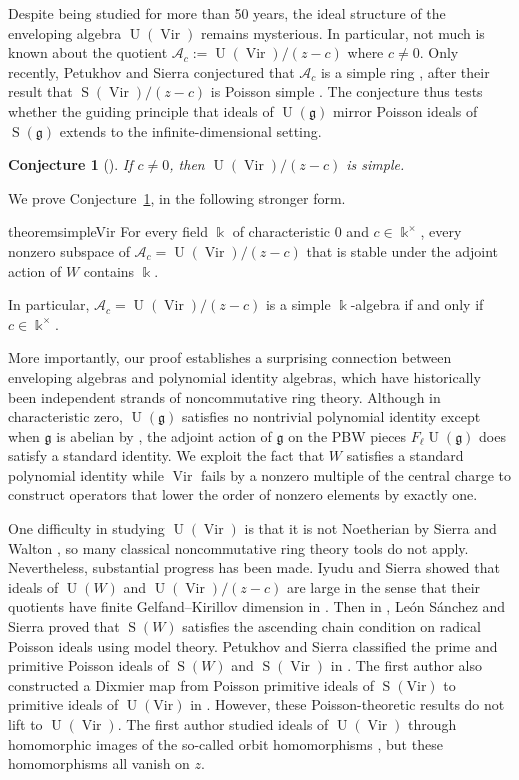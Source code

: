 \documentclass[12pt]{amsart}
\theoremstyle{plain}
\newtheorem{conjecture}[theorem]{Conjecture}
\theoremstyle{definition}
\numberwithin{equation}{theorem}
\newcommand{\kk}{\Bbbk}
\newcommand{\Vir}{\operatorname{Vir}}
\newcommand{\Sa}{\operatorname{S}}
\newcommand{\UU}{\operatorname{U}}
\newcommand{\calA}{\mathcal A}
\newcommand{\g}{\mathfrak{g}}
\begin{document}
Despite being studied for more than 50 years, the ideal structure of the enveloping algebra $\UU(\Vir)$ remains mysterious. In particular, not much is known about the quotient $\calA_c := \UU(\Vir)/(z-c)$ where $c \neq 0$. Only recently, Petukhov and Sierra conjectured that $\calA_c$ is a simple ring \cite[Conjecture 7.2.1]{PetukhovSierra2022}, after their result that $\Sa(\Vir)/(z-c)$ is Poisson simple \cite[Corollary 3.3.5]{PetukhovSierra2022}. The conjecture thus tests whether the guiding principle that ideals of $\UU(\g)$ mirror Poisson ideals of $\Sa(\g)$ extends to the infinite-dimensional setting.
\begin{conjecture}[{\cite[Conjecture 7.2.1]{PetukhovSierra2022}}]\label{conjecture: Poisson simple}
    If $c \neq 0$, then $\UU(\Vir)/(z-c)$ is simple. 
\end{conjecture}
We prove Conjecture~\ref{conjecture: Poisson simple}, in the following stronger form. 
 \begin{restatable}{theorem}{simpleVir}\label{thm: simple Vir}
    For every field $\kk$ of characteristic $0$ and $c \in \kk^\times$, every nonzero subspace of $\calA_c = \UU(\Vir)/(z-c)$ that is stable under the adjoint action of $W$ contains $\kk$. 
    
    In particular, $\calA_c =  \UU(\Vir)/(z-c)$ is a simple $\kk$-algebra if and only if $c \in \kk^\times$.
\end{restatable}

More importantly, our proof establishes a surprising connection between enveloping algebras and polynomial identity algebras, which have historically been independent strands of noncommutative ring theory. Although in characteristic zero, $\UU(\g)$ satisfies no nontrivial polynomial identity except when $\g$ is abelian by \cite{Latyvsev63, Bahturin74}, the adjoint action of $\g$ on the PBW pieces $F_\ell \UU(\g)$ does satisfy a standard identity. We exploit the fact that $W$ satisfies a standard polynomial identity while $\Vir$ fails by a nonzero multiple of the central charge to construct operators that lower the order of nonzero elements by exactly one.

One difficulty in studying $\UU(\Vir)$ is that it is not Noetherian by Sierra and Walton \cite{SierraWalton14, SierraWalton16}, so many classical noncommutative ring theory tools do not apply. Nevertheless, substantial progress has been made. Iyudu and Sierra showed that ideals of $\UU(W)$ and $\UU(\Vir)/(z-c)$ are large in the sense that their quotients have finite Gelfand--Kirillov dimension in \cite{IyuduSierra20}. Then in \cite{SanchezSierra23}, León Sánchez and Sierra proved that $\Sa(W)$ satisfies the ascending chain condition on radical Poisson ideals using model theory. Petukhov and Sierra classified the prime and primitive Poisson ideals of $\Sa(W)$ and $\Sa(\Vir)$ in \cite{PetukhovSierra2022}. The first author also constructed a Dixmier map from Poisson primitive ideals of $\Sa(\mathrm{Vir})$ to primitive ideals of $\UU(\mathrm{Vir})$ in \cite{pham2025orbit}. However, these Poisson-theoretic results do not lift to $\UU(\Vir)$. The first author studied ideals of $\UU(\Vir)$ through homomorphic images of the so-called orbit homomorphisms \cite{PhamTimmins25, pham2026ideals}, but these homomorphisms all vanish on $z$. 
\end{document}
